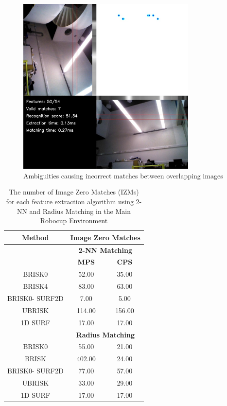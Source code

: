 \documentclass{report}
\begin{document}
\begin{figure}
  \centering
    \includegraphics[width=0.8\textwidth]{../Drawings/Matching/nonmatching.jpg}
    \caption{Ambiguities causing incorrect matches between overlapping images} 
    \label{fig:ambiguities}
\end{figure}



\begin{table}
\caption{The number of Image Zero Matches (IZMs) for each feature extraction
algorithm using 2-NN and Radius Matching in the Main Robocup Environment}
\begin{tabular}{|c|c|c|}
\hline 
\textbf{Method} & \multicolumn{2}{c|}{\textbf{Image Zero Matches}}\tabularnewline
\hline 
 & \multicolumn{2}{c|}{\textbf{2-NN Matching}}\tabularnewline
\hline 
 & \textbf{MPS} & \textbf{CPS}\tabularnewline
\hline 
\hline 
BRISK0 & 52.00 & 35.00\tabularnewline
\hline 
BRISK4 & 83.00 & 63.00\tabularnewline
\hline 
BRISK0- SURF2D & 7.00 & 5.00\tabularnewline
\hline 
UBRISK & 114.00 & 156.00\tabularnewline
\hline 
1D SURF & 17.00 & 17.00\tabularnewline
\hline 
 & \multicolumn{2}{c|}{\textbf{Radius Matching}}\tabularnewline
\hline 
BRISK0 & 55.00 & 21.00\tabularnewline
\hline 
BRISK & 402.00 & 24.00\tabularnewline
\hline 
BRISK0- SURF2D & 77.00 & 57.00\tabularnewline
\hline 
UBRISK & 33.00 & 29.00\tabularnewline
\hline 
1D SURF & 17.00 & 17.00\tabularnewline
\hline 
\end{tabular}
\label{tab:mrd_izm}
\end{table}
\end{document}
